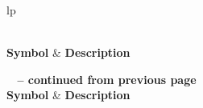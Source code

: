 ﻿%
{
\begin{longtable}{lp{\dimexpr\textwidth-5.6cm\relax}}
\caption{Important Variables and Mathematical Symbols}
\label{tab:symbols} \\

\hline
\textbf{Symbol} & \textbf{Description} \\
\hline
\endfirsthead

%
{{\bfseries \tablename\ \thetable{} -- continued from previous page}} \\
\hline
\textbf{Symbol} & \textbf{Description} \\
\hline
\endhead

\hline {} \\
\endfoot

\hline
\endlastfoot


\end{longtable}}
